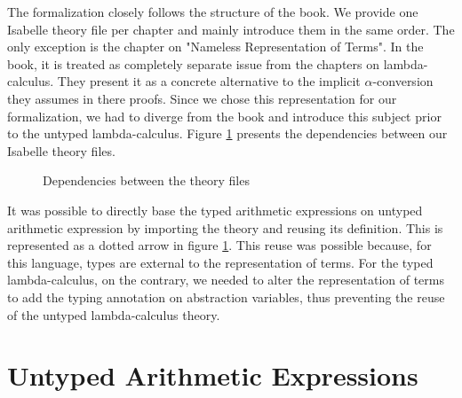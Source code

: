 \documentclass[a4paper, oneside, 12pt, titlepage]{article}
\begin{document}
The formalization closely follows the structure of the book. We provide one Isabelle theory file per
chapter and mainly introduce them in the same order. The only exception is the chapter on "Nameless
Representation of Terms". In the book, it is treated as completely separate issue from the chapters
on lambda-calculus. They present it as a concrete alternative to the implicit $\alpha$-conversion
they assumes in there proofs. Since we chose this representation for our formalization, we had to
diverge from the book and introduce this subject prior to the untyped lambda-calculus. Figure
\ref{fig:thys-dependencies} presents the dependencies between our Isabelle theory files.

\begin{figure}[h]
  \begin{center}
  \end{center}
  \caption{Dependencies between the theory files}
  \label{fig:thys-dependencies}
\end{figure}

It was possible to directly base the typed arithmetic expressions on untyped arithmetic expression
by importing the theory and reusing its definition. This is represented as a dotted arrow in figure
\ref{fig:thys-dependencies}. This reuse was possible because, for this language, types are external
to the representation of terms. For the typed lambda-calculus, on the contrary, we needed to alter
the representation of terms to add the typing annotation on abstraction variables, thus preventing
the reuse of the untyped lambda-calculus theory.

\section{Untyped Arithmetic Expressions}
\label{sec:untyped-arith-expr}
\end{document}
